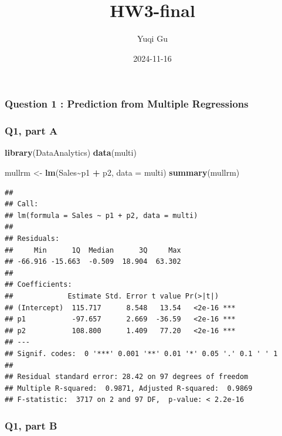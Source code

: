 \documentclass[
]{article}
\title{HW3-final}
\author{Yuqi Gu}
\date{2024-11-16}
\newenvironment{Shaded}{\begin{snugshade}}{\end{snugshade}}
\newcommand{\AttributeTok}[1]{\textcolor[rgb]{0.13,0.29,0.53}{#1}}
\newcommand{\FunctionTok}[1]{\textcolor[rgb]{0.13,0.29,0.53}{\textbf{#1}}}
\newcommand{\NormalTok}[1]{#1}
\newcommand{\OtherTok}[1]{\textcolor[rgb]{0.56,0.35,0.01}{#1}}
\newcommand{\SpecialCharTok}[1]{\textcolor[rgb]{0.81,0.36,0.00}{\textbf{#1}}}
\begin{document}
\maketitle

\subsubsection{Question 1 : Prediction from Multiple
Regressions}\label{question-1-prediction-from-multiple-regressions}

\subsubsection{Q1, part A}\label{q1-part-a}

\begin{Shaded}
\begin{Highlighting}[]
\FunctionTok{library}\NormalTok{(DataAnalytics) }
\FunctionTok{data}\NormalTok{(multi)}

\NormalTok{mullrm }\OtherTok{\textless{}{-}} \FunctionTok{lm}\NormalTok{(Sales}\SpecialCharTok{\textasciitilde{}}\NormalTok{p1 }\SpecialCharTok{+}\NormalTok{ p2, }\AttributeTok{data =}\NormalTok{ multi)}
\FunctionTok{summary}\NormalTok{(mullrm)}
\end{Highlighting}
\end{Shaded}

\begin{verbatim}
## 
## Call:
## lm(formula = Sales ~ p1 + p2, data = multi)
## 
## Residuals:
##     Min      1Q  Median      3Q     Max 
## -66.916 -15.663  -0.509  18.904  63.302 
## 
## Coefficients:
##             Estimate Std. Error t value Pr(>|t|)    
## (Intercept)  115.717      8.548   13.54   <2e-16 ***
## p1           -97.657      2.669  -36.59   <2e-16 ***
## p2           108.800      1.409   77.20   <2e-16 ***
## ---
## Signif. codes:  0 '***' 0.001 '**' 0.01 '*' 0.05 '.' 0.1 ' ' 1
## 
## Residual standard error: 28.42 on 97 degrees of freedom
## Multiple R-squared:  0.9871, Adjusted R-squared:  0.9869 
## F-statistic:  3717 on 2 and 97 DF,  p-value: < 2.2e-16
\end{verbatim}

\subsubsection{Q1, part B}\label{q1-part-b}

\begin{Shaded}
\end{Shaded}
\end{document}
